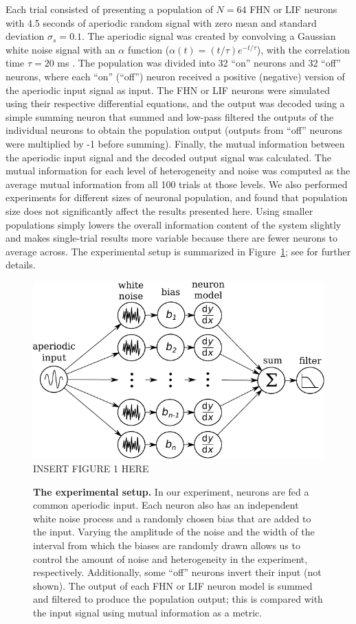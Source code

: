 \documentclass[letterpaper,11pt]{article}
\begin{document}
Each trial consisted of presenting a population of $N = 64$ FHN or LIF neurons with 4.5 seconds of aperiodic random signal with zero mean and standard deviation $\sigma_s = 0.1$.
The aperiodic signal was created by convolving a Gaussian white noise signal with an $\alpha$ function ($\alpha(t) = (t / \tau) e^{-t / \tau}$), with the correlation time $\tau = 20$ ms \citep{Mainen1995}.
The population was divided into 32 ``on'' neurons and 32 ``off'' neurons, where each ``on'' (``off'') neuron received a positive (negative) version of the aperiodic input signal as input. The FHN or LIF neurons were simulated using their respective differential equations, and the output was decoded using a simple summing neuron that summed and low-pass filtered the outputs of the individual neurons to obtain the population output (outputs from ``off'' neurons were multiplied by -1 before summing). Finally, the mutual information between the aperiodic input signal and the decoded output signal was calculated. The mutual information for each level of heterogeneity and noise was computed as the average mutual information from all 100 trials at those levels.
We also performed experiments for different sizes of neuronal population, and found that population size does not significantly affect the results presented here. Using smaller populations simply lowers the overall information content of the system slightly and makes single-trial results more variable because there are fewer neurons to average across.
The experimental setup is summarized in Figure~\ref{fig:exp}; see \textsc{} for further details.

\begin{figure}
  \ifx\hidefigures\undefined
    \centering
    \includegraphics{figure1_experiment.pdf}
  \else
    INSERT FIGURE 1 HERE
  \fi
  \caption{
    \textbf{The experimental setup.} In our experiment, neurons are fed a common aperiodic input. Each neuron also has an independent white noise process and a randomly chosen bias that are added to the input. Varying the amplitude of the noise and the width of the interval from which the biases are randomly drawn allows us to control the amount of noise and heterogeneity in the experiment, respectively. Additionally, some ``off'' neurons invert their input (not shown). The output of each FHN or LIF neuron model is summed and filtered to produce the population output; this is compared with the input signal using mutual information as a metric.
  }
  \label{fig:exp}
\end{figure}
\end{document}
